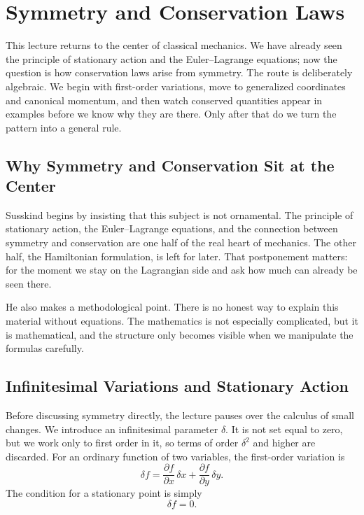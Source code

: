 \chapter{Symmetry and Conservation Laws}

This lecture returns to the center of classical mechanics. We have already seen the principle of stationary action and the Euler--Lagrange equations; now the question is how conservation laws arise from symmetry. The route is deliberately algebraic. We begin with first-order variations, move to generalized coordinates and canonical momentum, and then watch conserved quantities appear in examples before we know why they are there. Only after that do we turn the pattern into a general rule.

\section{Why Symmetry and Conservation Sit at the Center}

Susskind begins by insisting that this subject is not ornamental. The principle of stationary action, the Euler--Lagrange equations, and the connection between symmetry and conservation are one half of the real heart of mechanics. The other half, the Hamiltonian formulation, is left for later. That postponement matters: for the moment we stay on the Lagrangian side and ask how much can already be seen there.

He also makes a methodological point. There is no honest way to explain this material without equations. The mathematics is not especially complicated, but it is mathematical, and the structure only becomes visible when we manipulate the formulas carefully.

\section{Infinitesimal Variations and Stationary Action}

Before discussing symmetry directly, the lecture pauses over the calculus of small changes. We introduce an infinitesimal parameter \(\delta\). It is not set equal to zero, but we work only to first order in it, so terms of order \(\delta^2\) and higher are discarded. For an ordinary function of two variables, the first-order variation is
\begin{equation}
\delta f
=
\frac{\partial f}{\partial x}\,\delta x
+
\frac{\partial f}{\partial y}\,\delta y.
\end{equation}
The condition for a stationary point is simply
\begin{equation}
\delta f = 0.
\end{equation}

